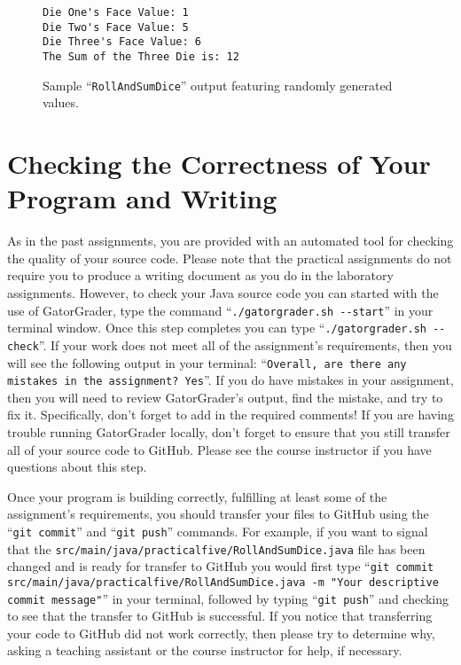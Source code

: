 \documentclass[11pt]{article}
\newcommand{\mainprogramsource}{\lstinline{src/main/java/practicalfive/RollAndSumDice.java}}
\newcommand{\gatorgraderstart}{\command{./gatorgrader.sh --start}}
\newcommand{\gatorgradercheck}{\command{./gatorgrader.sh --check}}
\newcommand{\gitcommit}{\command{git commit}}
\newcommand{\gitpush}{\command{git push}}
\newcommand{\gitcommitmainprogram}{\command{git commit src/main/java/practicalfive/RollAndSumDice.java -m "Your
descriptive commit message"}}
\newcommand{\command}[1]{``\lstinline{#1}''}
\begin{document}
\begin{figure}[tb]
\begin{Verbatim}[commandchars=\\\{\}]
Die One's Face Value: 1
Die Two's Face Value: 5
Die Three's Face Value: 6
The Sum of the Three Die is: 12
\end{Verbatim}
\vspace*{-.1in}
\caption{Sample ``{\tt RollAndSumDice}'' output featuring randomly generated values.}
\label{mad}
\end{figure}


\section*{Checking the Correctness of Your Program and Writing}

As in the past assignments, you are provided with an automated tool for checking the quality of your source code. Please
note that the practical assignments do not require you to produce a writing document as you do in the laboratory
assignments. However, to check your Java source code you can started with the use of GatorGrader, type the command
\gatorgraderstart{} in your terminal window. Once this step completes you can type \gatorgradercheck{}. If your work
does not meet all of the assignment's requirements, then you will see the following output in your terminal:
\command{Overall, are there any mistakes in the assignment? Yes}. If you do have mistakes in your assignment, then you
will need to review GatorGrader's output, find the mistake, and try to fix it. Specifically, don't forget to add in the
required comments! If you are having trouble running GatorGrader locally, don't forget to ensure that you still transfer
all of your source code to GitHub. Please see the course instructor if you have questions about this step.

Once your program is building correctly, fulfilling at least some of the assignment's requirements, you should transfer
your files to GitHub using the \gitcommit{} and \gitpush{} commands. For example, if you want to signal that the
\mainprogramsource{} file has been changed and is ready for transfer to GitHub you would first type
\gitcommitmainprogram{} in your terminal, followed by typing \gitpush{} and checking to see that the transfer to GitHub
is successful. If you notice that transferring your code to GitHub did not work correctly, then please try to determine
why, asking a teaching assistant or the course instructor for help, if necessary.
\end{document}
